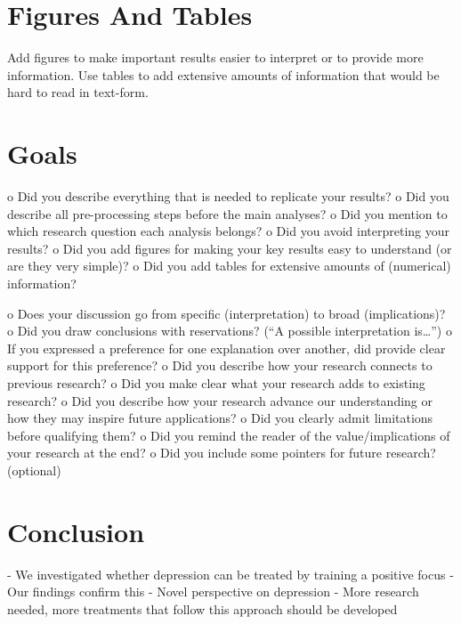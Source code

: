 \section{Figures And Tables}
\label{figures-and-tables}

Add figures to make important results easier to interpret or to provide more information. Use tables to add extensive amounts of information that would be hard to read in text-form.

\section{Goals}
\label{chapter5-goals}

o Did you describe everything that is needed to replicate your results?
o Did you describe all pre-processing steps before the main analyses?
o Did you mention to which research question each analysis belongs?
o Did you avoid interpreting your results?
o Did you add figures for making your key results easy to understand (or are they very simple)?
o Did you add tables for extensive amounts of (numerical) information?

o Does your discussion go from specific (interpretation) to broad (implications)?
o Did you draw conclusions with reservations? (“A possible interpretation is…”)
o If you expressed a preference for one explanation over another, did provide clear
support for this preference?
o Did you describe how your research connects to previous research?
o Did you make clear what your research adds to existing research?
o Did you describe how your research advance our understanding or how they may inspire
future applications?
o Did you clearly admit limitations before qualifying them?
o Did you remind the reader of the value/implications of your research at the end?
o Did you include some pointers for future research? (optional)


\section{Conclusion}
\label{conclusion}

- We investigated whether depression can be treated by training a positive focus
- Our findings confirm this
- Novel perspective on depression
- More research needed, more treatments that follow this approach should be developed
